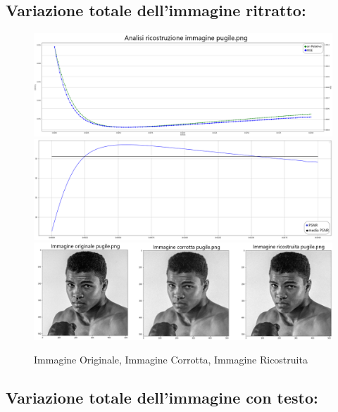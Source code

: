 \newpage
{\color{rred}\subsection{Variazione totale dell'immagine ritratto:}}
\begin{figure}[H]
    \centering
    \includegraphics[width=\textwidth]{IMMAGINI_RELAZIONE/graficoPugileTOTVAR_ERRREL&MSE.png}
    \includegraphics[width=\textwidth]{IMMAGINI_RELAZIONE/graficoPugileTOTVAR_PSNR&suaMedia.png}
    \includegraphics[width=\textwidth]{imgRicostruzione/ricostruzionePugile_TOTVAR_maxPSNR33.70.png}
    \caption{Immagine Originale, Immagine Corrotta, Immagine Ricostruita}
\end{figure}
\newpage
{\color{rred}\subsection{Variazione totale dell'immagine con testo:}}
